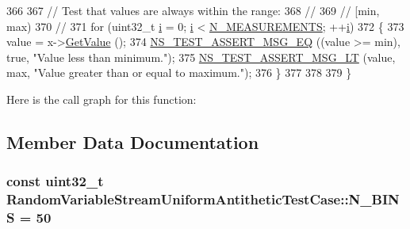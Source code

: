 \begin{DoxyCode}
366  
367   \textcolor{comment}{// Test that values are always within the range:}
368   \textcolor{comment}{//}
369   \textcolor{comment}{//     [min, max)}
370   \textcolor{comment}{//}
371   \textcolor{keywordflow}{for} (uint32\_t \hyperlink{bernuolliDistribution_8m_a6f6ccfcf58b31cb6412107d9d5281426}{i} = 0; \hyperlink{bernuolliDistribution_8m_a6f6ccfcf58b31cb6412107d9d5281426}{i} < \hyperlink{classRandomVariableStreamUniformAntitheticTestCase_ae266badde024691eca523904beeb81f5}{N\_MEASUREMENTS}; ++\hyperlink{bernuolliDistribution_8m_a6f6ccfcf58b31cb6412107d9d5281426}{i})
372     \{
373       value = x->\hyperlink{classns3_1_1UniformRandomVariable_a03822d8c86ac51e9aa83bbc73041386b}{GetValue} ();
374       \hyperlink{group__testing_ga2a9d78cffb3db8e867c35fff0b698cf5}{NS\_TEST\_ASSERT\_MSG\_EQ} ((value >= min), \textcolor{keyword}{true}, \textcolor{stringliteral}{"Value less than minimum."});
375       \hyperlink{group__testing_ga1d96848b91407c9a0b36583e8b0ad7ae}{NS\_TEST\_ASSERT\_MSG\_LT} (value, max, \textcolor{stringliteral}{"Value greater than or equal to maximum."});
376     \}
377 
378 
379 \}
\end{DoxyCode}


Here is the call graph for this function\+:




\subsection{Member Data Documentation}
\subsubsection[{\texorpdfstring{N\+\_\+\+B\+I\+NS}{N_BINS}}]{\setlength{\rightskip}{0pt plus 5cm}const uint32\+\_\+t Random\+Variable\+Stream\+Uniform\+Antithetic\+Test\+Case\+::\+N\+\_\+\+B\+I\+NS = 50\hspace{0.3cm}{\ttfamily [static]}}\hypertarget{classRandomVariableStreamUniformAntitheticTestCase_a5190e19d3366cfdbdcf9dd3d67fcb667}{}\label{classRandomVariableStreamUniformAntitheticTestCase_a5190e19d3366cfdbdcf9dd3d67fcb667}
